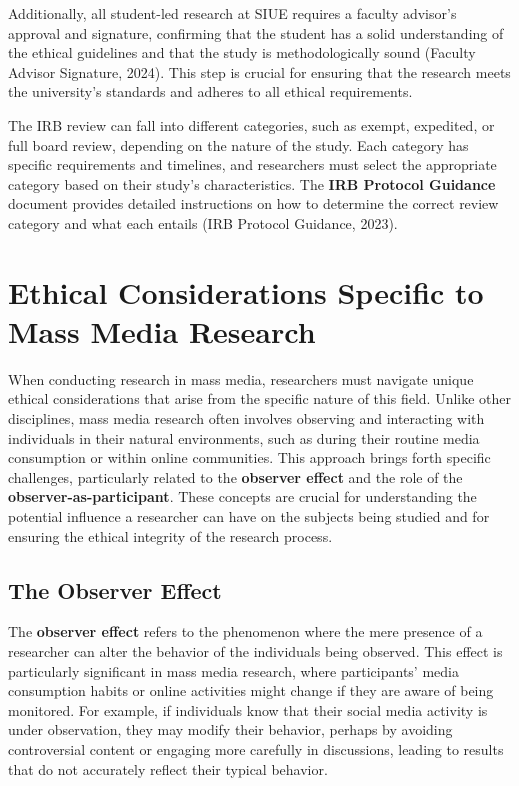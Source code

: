 \documentclass[
]{book}
\begin{document}
Additionally, all student-led research at SIUE requires a faculty advisor's approval and signature, confirming that the student has a solid understanding of the ethical guidelines and that the study is methodologically sound (Faculty Advisor Signature, 2024). This step is crucial for ensuring that the research meets the university's standards and adheres to all ethical requirements.

The IRB review can fall into different categories, such as exempt, expedited, or full board review, depending on the nature of the study. Each category has specific requirements and timelines, and researchers must select the appropriate category based on their study's characteristics. The \textbf{IRB Protocol Guidance} document provides detailed instructions on how to determine the correct review category and what each entails (IRB Protocol Guidance, 2023).

\section{Ethical Considerations Specific to Mass Media Research}\label{ethical-considerations-specific-to-mass-media-research}

When conducting research in mass media, researchers must navigate unique ethical considerations that arise from the specific nature of this field. Unlike other disciplines, mass media research often involves observing and interacting with individuals in their natural environments, such as during their routine media consumption or within online communities. This approach brings forth specific challenges, particularly related to the \textbf{observer effect} and the role of the \textbf{observer-as-participant}. These concepts are crucial for understanding the potential influence a researcher can have on the subjects being studied and for ensuring the ethical integrity of the research process.

\subsection*{The Observer Effect}\label{the-observer-effect}

The \textbf{observer effect} refers to the phenomenon where the mere presence of a researcher can alter the behavior of the individuals being observed. This effect is particularly significant in mass media research, where participants' media consumption habits or online activities might change if they are aware of being monitored. For example, if individuals know that their social media activity is under observation, they may modify their behavior, perhaps by avoiding controversial content or engaging more carefully in discussions, leading to results that do not accurately reflect their typical behavior.
\end{document}
